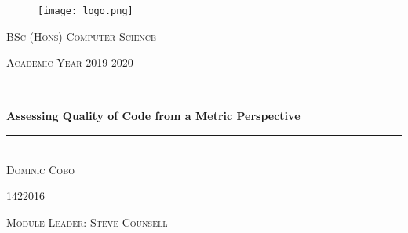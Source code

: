 \documentclass[a4paper, 10pt]{article}
\newcommand{\fypCourse}{BSc (Hons) Computer Science}
\newcommand{\fypStudent}{Dominic Cobo}
\newcommand{\fypStudentId}{1422016}
\newcommand{\moduleLeader}{Steve Counsell}
\newcommand{\fypAcademicYear}{2019-2020}
\newcommand{\fypTitle}{Assessing Quality of Code from a Metric Perspective}
\begin{document}
	\begin{titlepage}
		\centering
		\begin{figure}
			\texttt{[image: logo.png]}
		\end{figure}
		\textsc{\LARGE \fypCourse}
		
		\textsc{\large Academic Year \fypAcademicYear}
		
		\rule{\linewidth}{0.5mm} \\[0.5cm]
		{ \huge\textbf { \fypTitle } } \\
		\rule{\linewidth}{0.5mm} \\[6cm]
		
		
		\textsc{\huge \fypStudent}
		
		\textsc{\large \fypStudentId}
		
		\bigskip
		
		\textsc{\large Module Leader: \moduleLeader}
		
		\bigskip
		
	\end{titlepage}
	
	\newpage
	
	
	
	
	
	

	\printbibliography
	
\end{document}
